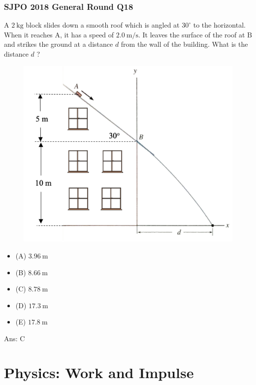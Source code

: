 \documentclass{article}
\begin{document}
\begin{samepage}
\subsubsection{SJPO 2018 General Round Q18}
A $2 \mathrm{~kg}$ block slides down a smooth roof which is angled at $30^{\circ}$ to the horizontal. When it reaches $\mathrm{A}$, it has a speed of $2.0 \mathrm{~m} / \mathrm{s}$. It leaves the surface of the roof at $\mathrm{B}$ and strikes the ground at a distance $d$ from the wall of the building. What is the distance $d$ ?
{
 \begin{figure} 
\includegraphics[width=\linewidth]{images/2018q18.png}
\end{figure}
\begin{itemize}
\item[](A) $3.96 \mathrm{~m}$
\item[](B) $8.66 \mathrm{~m}$
\item[](C) $8.78 \mathrm{~m}$
\item[](D) $17.3 \mathrm{~m}$
\item[](E) $17.8 \mathrm{~m}$
\end{itemize}
}
Ans: \ifpaper C \fi \\[10pt]
\end{samepage}



\section{Physics: Work and Impulse}
\end{document}
